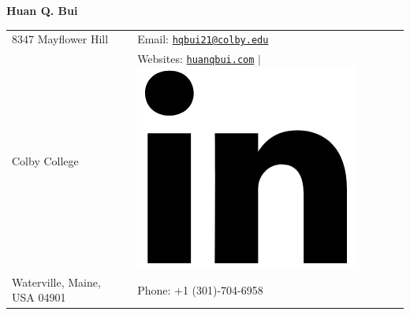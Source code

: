 \documentclass[10pt]{article}
\begin{document}
\noindent  
\begin{center}
{\Huge{\textbf{Huan Q. Bui}}}
\end{center}
\vspace{-10pt}
\hrulefill
\vspace{-1ex}

\normalsize


\begin{center}
\begin{tabular}{l l}
     8347 Mayflower Hill 		 & \hspace{1in} Email: \href{mailto:hqbui21@colby.edu}{\texttt{hqbui21@colby.edu}} \\
     Colby College 				 & \hspace{1in}  Websites: \href{www.huanqbui.com}{\texttt{huanqbui.com}} $\vert$ 					\href{https://www.linkedin.com/in/huan-bui/}{\includegraphics[scale=0.04]{linkedin_logo.PNG}} \\
 	Waterville, Maine, USA 04901 & \hspace{1in} Phone: +1 (301)-704-6958\\
\end{tabular}
\end{center}
\end{document}
